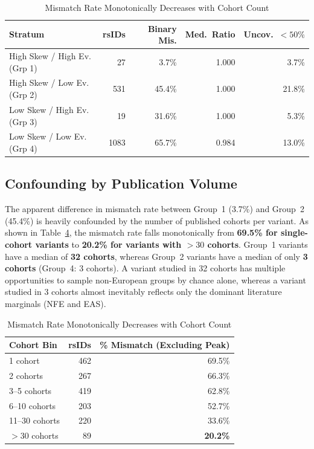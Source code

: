 \documentclass[conference]{IEEEtran}
\begin{document}
\begin{table}[!t]
\begin{table}[!t]
\centering
\caption{Cohort Ancestry Concordance and Coverage by Stratum}
\label{tab:ancestry-strata}
\renewcommand{\arraystretch}{1.15}
\begin{tabular}{|l|r|r|r|r|}
\hline
\textbf{Stratum} & \textbf{rsIDs} & \textbf{Binary Mis.} & \textbf{Med.\ Ratio} & \textbf{Uncov.\ $<50\%$} \\
\hline
High Skew / High Ev. (Grp 1) &   27 &   3.7\% & 1.000 &  3.7\% \\
\hline
High Skew / Low Ev. (Grp 2)  &  531 &  45.4\% & 1.000 & 21.8\% \\
\hline
Low Skew / High Ev. (Grp 3)  &   19 &  31.6\% & 1.000 &  5.3\% \\
\hline
Low Skew / Low Ev. (Grp 4)   & 1083 &  65.7\% & 0.984 & 13.0\% \\
\hline
\end{tabular}
\end{table}

\subsection{Confounding by Publication Volume}

The apparent difference in mismatch rate between Group~1 (3.7\%) and Group~2 (45.4\%) is heavily confounded by the number of published cohorts per variant.
As shown in Table~\ref{tab:cohort-confound}, the mismatch rate falls monotonically from \textbf{69.5\% for single-cohort variants} to \textbf{20.2\% for variants with $>30$ cohorts}.
Group~1 variants have a median of \textbf{32 cohorts}, whereas Group~2 variants have a median of only \textbf{3 cohorts} (Group~4: 3 cohorts).
A variant studied in 32 cohorts has multiple opportunities to sample non-European groups by chance alone, whereas a variant studied in 3 cohorts almost inevitably reflects only the dominant literature marginals (NFE and EAS).

\begin{table}[!t]
\centering
\caption{Mismatch Rate Monotonically Decreases with Cohort Count}
\label{tab:cohort-confound}
\renewcommand{\arraystretch}{1.15}
\begin{tabular}{|l|r|r|}
\hline
\textbf{Cohort Bin} & \textbf{rsIDs} & \textbf{\% Mismatch (Excluding Peak)} \\
\hline
1 cohort    & 462 & 69.5\% \\
\hline
2 cohorts   & 267 & 66.3\% \\
\hline
3--5 cohorts & 419 & 62.8\% \\
\hline
6--10 cohorts & 203 & 52.7\% \\
\hline
11--30 cohorts & 220 & 33.6\% \\
\hline
$> 30$ cohorts &  89 & \textbf{20.2\%} \\
\hline
\end{tabular}
\end{table}


\end{table}
\end{document}
